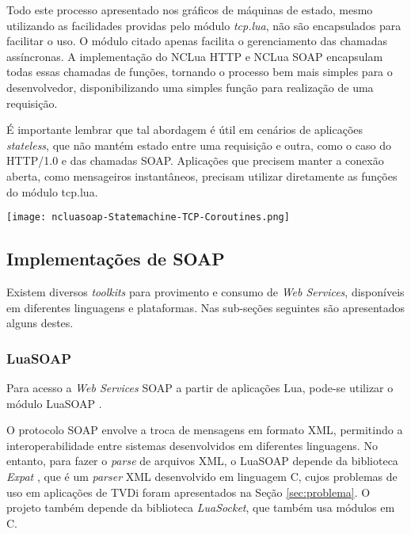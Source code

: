 Todo este processo apresentado nos gráficos de máquinas de estado,
mesmo utilizando as facilidades providas pelo módulo \textit{tcp.lua},
não são encapsulados para facilitar o uso. O módulo citado
apenas facilita o gerenciamento das chamadas assíncronas.
A implementação do NCLua HTTP e NCLua SOAP encapsulam todas
essas chamadas de funções, tornando o processo bem mais simples para
o desenvolvedor, disponibilizando uma simples função
para realização de uma requisição.

É importante lembrar que tal abordagem é útil em cenários
de aplicações \textit{stateless}, que não mantém
estado entre uma requisição e outra, como o caso do HTTP/1.0
e das chamadas SOAP. Aplicações que precisem manter a conexão
aberta, como mensageiros instantâneos, precisam utilizar
diretamente as funções do módulo tcp.lua.

\begin{center}
	\texttt{[image: ncluasoap-Statemachine-TCP-Coroutines.png]}
	\label{fig:tcp-state-machine-coroutines}
\end{center}

\subsection{Implementações de SOAP}

Existem diversos \textit{toolkits} para provimento e consumo de \textit{Web Services}, disponíveis em diferentes linguagens e plataformas.
Nas sub-seções seguintes são apresentados alguns destes.

\subsubsection{LuaSOAP}

Para acesso a \textit{Web Services} SOAP a partir de aplicações Lua, pode-se utilizar o módulo LuaSOAP \cite{luasoap}.

O protocolo SOAP envolve a troca de mensagens em formato XML, permitindo a interoperabilidade entre sistemas desenvolvidos
em diferentes linguagens. No entanto, para fazer o \textit{parse} de arquivos XML, o LuaSOAP depende da biblioteca
\textit{Expat} \cite{expat}\cite{cooper1999using}, que é um \textit{parser} XML desenvolvido em linguagem C, cujos problemas de uso
em aplicações de TVDi foram apresentados na Seção \ref{sec:problema}. O projeto também depende da biblioteca \textit{LuaSocket},
que também usa módulos em C.

